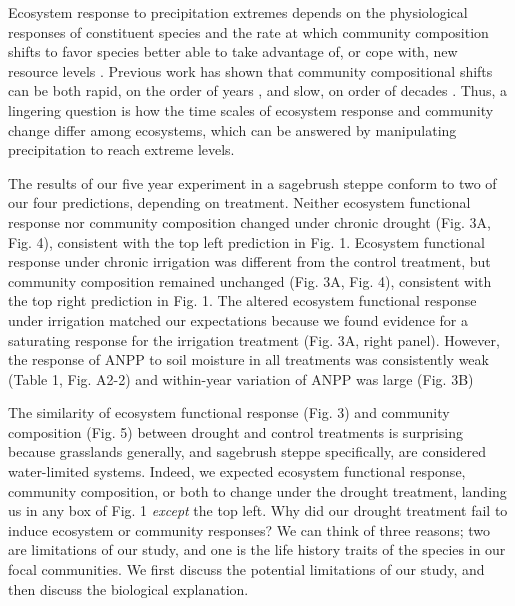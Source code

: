 \documentclass[fleqn,10pt,lineno]{wlpeerj} %
\begin{document}
Ecosystem response to precipitation extremes depends on the
physiological responses of constituent species and the rate at which
community composition shifts to favor species better able to take
advantage of, or cope with, new resource levels \citep{Smith2009}.
Previous work has shown that community compositional shifts can be both
rapid, on the order of years \citep{Hoover2014}, and slow, on order of
decades \citep{Knapp2012, Wilcox2016}. Thus, a lingering question is how
the time scales of ecosystem response and community change differ among
ecosystems, which can be answered by manipulating precipitation to reach
extreme levels.

The results of our five year experiment in a sagebrush steppe conform to
two of our four predictions, depending on treatment. Neither ecosystem
functional response nor community composition changed under chronic
drought (Fig. 3A, Fig. 4), consistent with the top left prediction in
Fig. 1. Ecosystem functional response under chronic irrigation was
different from the control treatment, but community composition remained
unchanged (Fig. 3A, Fig. 4), consistent with the top right prediction in
Fig. 1. The altered ecosystem functional response under irrigation
matched our expectations because we found evidence for a saturating
response for the irrigation treatment (Fig. 3A, right panel). However,
the response of ANPP to soil moisture in all treatments was consistently
weak (Table 1, Fig. A2-2) and within-year variation of ANPP was large
(Fig. 3B)

The similarity of ecosystem functional response (Fig. 3) and community
composition (Fig. 5) between drought and control treatments is
surprising because grasslands generally, and sagebrush steppe
specifically, are considered water-limited systems. Indeed, we expected
ecosystem functional response, community composition, or both to change
under the drought treatment, landing us in any box of Fig. 1
\emph{except} the top left. Why did our drought treatment fail to induce
ecosystem or community responses? We can think of three reasons; two are
limitations of our study, and one is the life history traits of the
species in our focal communities. We first discuss the potential
limitations of our study, and then discuss the biological explanation.
\end{document}
